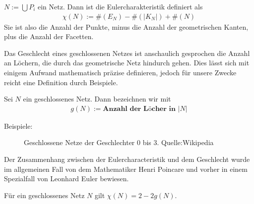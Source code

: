 \begin{Definition}
$N:= \bigcup P_i$ ein Netz. Dann ist die Eulercharakteristik definiert als
\begin{align*}
\chi(N):= \#(E_N) - \#(|K_N|) + \#(N) 
\end{align*}
Sie ist also die Anzahl der  Punkte, minus die Anzahl der geometrischen Kanten, plus die Anzahl der Facetten.
\end{Definition}

Das Geschlecht eines geschlossenen Netzes ist anschaulich gesprochen die Anzahl an Löchern, die durch das geometrische Netz hindurch gehen. Dies lässt sich mit einigem Aufwand mathematisch präzise definieren, jedoch für unsere Zwecke reicht eine Definition durch Beispiele.
\begin{Definition}
Sei $N$ ein geschlossenes Netz. Dann bezeichnen wir mit
\begin{align*}
g(N):= \textbf{Anzahl der Löcher in } |N|
\end{align*}
\end{Definition}
Beispiele:

\begin{figure}[H]\centering
    \hspace*{0.1\textwidth}
    \vspace*{1em}
    \hspace*{0.1\textwidth}
    \caption{Geschlossene Netze der Geschlechter $0$ bis $3$. Quelle:Wikipedia}
    \label{fig:closed-mesh-genders-0..3}
\end{figure}

Der Zusammenhang zwischen der Eulercharacteristik und dem Geschlecht wurde im allgemeinen Fall von dem Mathematiker  
Henri Poincare und vorher in einem Spezialfall von Leonhard Euler bewiesen. 
\begin{Satz}
Für ein geschlossenes Netz $N$ gilt $\chi(N) = 2 - 2g(N)$. 
\end{Satz}

